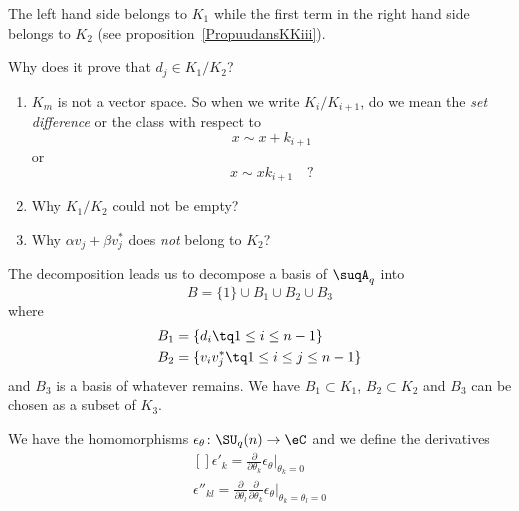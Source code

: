     The left hand side belongs to $K_1$ while the first term in the right hand side belongs to $K_2$ (see proposition~\ref{PropuudansKKiii}).

    \begin{probleme}
        Why does it prove that $d_j\in K_1/K_2$?
        \begin{enumerate}
            \item
                $K_m$ is not a vector space. So when we write $K_i/K_{i+1}$, do we mean the \emph{set difference} or the class with respect to
                \begin{equation}
                    x\sim x+k_{i+1}
                \end{equation}
                or
                \begin{equation}
                    x\sim xk_{i+1}\quad ?
                \end{equation}
            \item
                Why $K_1/K_2$ could not be empty?
            \item
                Why $\alpha v_j+\beta v_j^*$ does \emph{not} belong to $K_2$?
        \end{enumerate}

    \end{probleme}

The decomposition leads us to decompose a basis of $\suqA_q$ into
\begin{equation}
    B=\{ 1 \}\cup B_1\cup B_2\cup B_3
\end{equation}
where
\begin{equation}
    \begin{aligned}[]
        B_1&=\{ d_i\tq 1\leq i\leq n-1 \}\\
        B_2&=\{ v_iv_j^*\tq 1\leq i\leq j\leq n-1 \}
    \end{aligned}
\end{equation}
and $B_3$ is a basis of whatever remains. We have $B_1\subset K_1$, $B_2\subset K_2$ and $B_3$ can be chosen as a subset of $K_3$.


We have the homomorphisms $\epsilon_{\theta}\colon \SU_q(n)\to \eC$ and we define the derivatives
\begin{equation}
    \begin{aligned}[]
        \epsilon'_k=\frac{ \partial  }{ \partial \theta_k }\epsilon_{\theta}|_{\theta_k=0}\\
        \epsilon''_{kl}=\frac{ \partial  }{ \partial \theta_l }\frac{ \partial  }{ \partial \theta_k }\epsilon_{\theta}|_{\theta_k=\theta_l=0}
    \end{aligned}
\end{equation}

